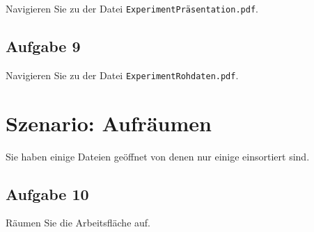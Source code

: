 \documentclass[12pt,]{article}
\begin{document}
Navigieren Sie zu der Datei \texttt{ExperimentPräsentation.pdf}.

\newpage

\subsection{Aufgabe 9}

Navigieren Sie zu der Datei \texttt{ExperimentRohdaten.pdf}.

\newpage

\section{Szenario: Aufräumen}

Sie haben einige Dateien geöffnet von denen nur einige einsortiert sind.

\subsection{Aufgabe 10}

Räumen Sie die Arbeitsfläche auf.
\end{document}
